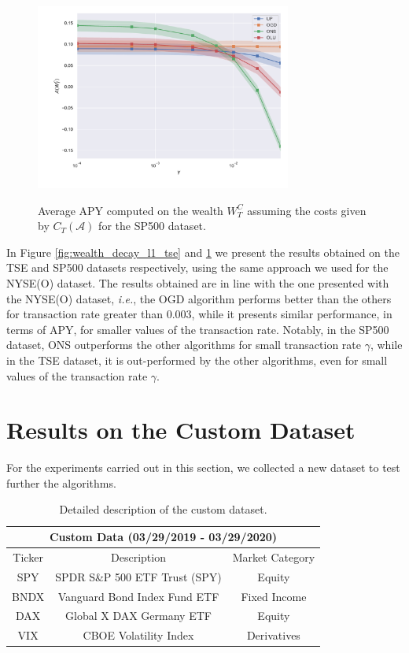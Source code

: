 \begin{figure}[ht!]
\centering
{\includegraphics[width=0.75\textwidth,keepaspectratio]{img/fig_w_decay_l1_sp500.pdf}} 
\caption{Average APY computed on the wealth $W_T^C$ assuming the costs given by $C_T(\mathcal{A})$ for the SP500 dataset.}
\label{fig:wealth_decay_l1_sp500}
\end{figure}

In Figure \ref{fig:wealth_decay_l1_tse} and \ref{fig:wealth_decay_l1_sp500} we present the results obtained on the TSE and SP500 datasets respectively, using the same approach we used for the NYSE(O) dataset.  The results obtained are in line with the one presented with the NYSE(O) dataset, \emph{i.e.}, the OGD algorithm performs better than the others for transaction rate greater than $0.003$, while it presents similar performance, in terms of APY, for smaller values of the transaction rate. Notably, in the SP500 dataset, ONS outperforms the other algorithms for small transaction rate $\gamma$, while in the TSE dataset, it is out-performed by the other algorithms, even for small values of the transaction rate $\gamma$.

\section{Results on the Custom Dataset}

For the experiments carried out in this section, we collected a new dataset to test further the algorithms.

\begin{table}[ht!]\centering
\begin{tabular}{ |c||c|c| }
 \hline
 \multicolumn{3}{|c|}{Custom Data (03/29/2019 - 03/29/2020)} \\
 \hline
 Ticker & Description & Market Category\\
 \hline
 SPY & SPDR S\&P 500 ETF Trust (SPY)  & Equity\\
 BNDX &  Vanguard Bond Index Fund ETF & Fixed Income\\
 DAX & Global X DAX Germany ETF & Equity\\
 VIX & CBOE Volatility Index & Derivatives\\
 \hline
\end{tabular}
\caption{Detailed description of the custom dataset.}\label{tab:dataset_custom}
\end{table}

